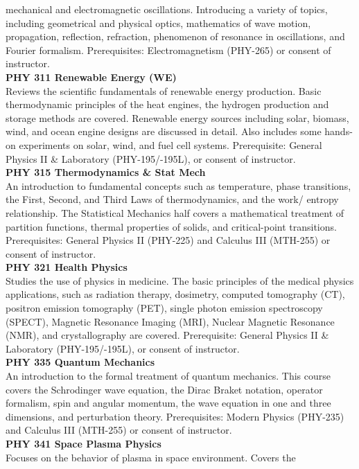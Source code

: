 \documentclass[
  letterpaper,
]{scrbook}
\begin{document}
mechanical and electromagnetic oscillations. Introducing a variety of
topics, including geometrical and physical optics, mathematics of wave
motion, propagation, reflection, refraction, phenomenon of resonance in
oscillations, and Fourier formalism. Prerequisites: Electromagnetism
(PHY-265) or consent of instructor.\\
\textbf{PHY 311 Renewable Energy (WE)}\\
Reviews the scientific fundamentals of renewable energy production.
Basic thermodynamic principles of the heat engines, the hydrogen
production and storage methods are covered. Renewable energy sources
including solar, biomass, wind, and ocean engine designs are discussed
in detail. Also includes some hands-on experiments on solar, wind, and
fuel cell systems. Prerequisite: General Physics II \& Laboratory
(PHY-195/-195L), or consent of instructor.\\
\textbf{PHY 315 Thermodynamics \& Stat Mech}\\
An introduction to fundamental concepts such as temperature, phase
transitions, the First, Second, and Third Laws of thermodynamics, and
the work/ entropy relationship. The Statistical Mechanics half covers a
mathematical treatment of partition functions, thermal properties of
solids, and critical-point transitions. Prerequisites: General Physics
II (PHY-225) and Calculus III (MTH-255) or consent of instructor.\\
\textbf{PHY 321 Health Physics}\\
Studies the use of physics in medicine. The basic principles of the
medical physics applications, such as radiation therapy, dosimetry,
computed tomography (CT), positron emission tomography (PET), single
photon emission spectroscopy (SPECT), Magnetic Resonance Imaging (MRI),
Nuclear Magnetic Resonance (NMR), and crystallography are covered.
Prerequisite: General Physics II \& Laboratory (PHY-195/-195L), or
consent of instructor.\\
\textbf{PHY 335 Quantum Mechanics}\\
An introduction to the formal treatment of quantum mechanics. This
course covers the Schrodinger wave equation, the Dirac Braket notation,
operator formalism, spin and angular momentum, the wave equation in one
and three dimensions, and perturbation theory. Prerequisites: Modern
Physics (PHY-235) and Calculus III (MTH-255) or consent of instructor.\\
\textbf{PHY 341 Space Plasma Physics}\\
Focuses on the behavior of plasma in space environment. Covers the
\end{document}
